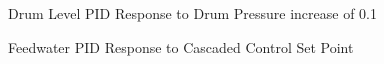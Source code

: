     \begin{figure}[ht]
        \begin{center}
            \caption{Drum Level PID Response to Drum Pressure increase of 0.1}
            \label{fig:PID_Level_PressStep}
        \end{center}
    \end{figure}   %
    \begin{figure}[ht]
        \begin{center}
            \caption{Feedwater PID Response to Cascaded Control Set Point}
            \label{fig:PID_Feedwater_PressStep}
        \end{center}
    \end{figure}   %
